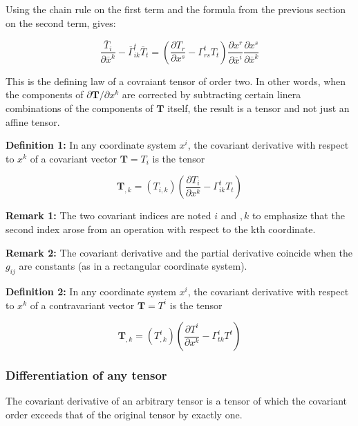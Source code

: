 \documentclass{article}
\begin{document}
Using the chain rule on the first term and the formula from the previous section on the second term, gives:

\begin{equation}
	\frac{ \overline{ T }_i }{ \partial \overline{ x }^k } - \overline{ \Gamma }^t_{ik} \overline{ T }_t = \left( \frac{ \partial T_r }{ \partial x^s } - \Gamma^t_{rs} T_t \right) \frac{ \partial x^r }{ \partial \overline{ x }^i } \frac{ \partial x^s }{ \partial \overline{ x }^k }
\end{equation}

This is the defining law of a covraiant tensor of order two.  In other words, when the components of $\partial \mathbf{ T } / \partial x^k$ are corrected by subtracting certain linera combinations of the components of $\mathbf{ T }$ itself,
the result is a tensor and not just an affine tensor.

\noindent \textbf{Definition 1: }
In any coordinate system $x^i$, the covariant derivative with respect to $x^k$ of a covariant vector $\mathbf{ T } = T_i$ is the tensor

\begin{equation*}
	\mathbf{ T }_{,k} = (T_{i,k}) \left( \frac{ \partial T_i }{ \partial x^k } - \Gamma^t_{ik} T_t \right)
\end{equation*}

\noindent \textbf{Remark 1: }
The two covariant indices are noted $i$ and $,k$ to emphasize that the second index arose from an operation with respect to the kth coordinate.

\noindent \textbf{Remark 2: }
The covariant derivative and the partial derivative coincide when the $g_{ij}$ are constants (as in a rectangular coordinate system).

\noindent \textbf{Definition 2: }
In any coordinate system $x^i$, the covariant derivative with respect to $x^k$ of a contravariant vector $\mathbf{ T } = T^i$ is the tensor

\begin{equation*}
	\mathbf{ T }_{,k} = (T^i_{,k}) \left( \frac{ \partial T^i }{ \partial x^k } - \Gamma^i_{tk} T^t \right)
\end{equation*}

\subsubsection{Differentiation of any tensor}

The covariant derivative of an arbitrary tensor is a tensor of which the covariant order exceeds that of the original tensor by exactly one.
\end{document}
